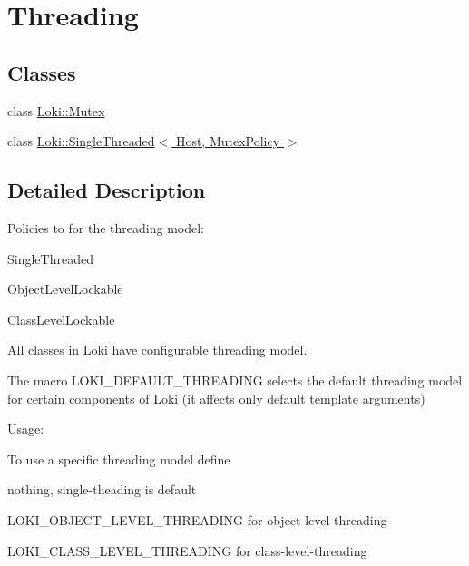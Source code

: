 \hypertarget{group__ThreadingGroup}{}\section{Threading}
\label{group__ThreadingGroup}
\subsection*{Classes}
\begin{DoxyCompactItemize}
\item 
class \hyperlink{classLoki_1_1Mutex}{Loki\+::\+Mutex}
\item 
class \hyperlink{classLoki_1_1SingleThreaded}{Loki\+::\+Single\+Threaded$<$ Host, Mutex\+Policy $>$}
\end{DoxyCompactItemize}


\subsection{Detailed Description}
Policies to for the threading model\+:


\begin{DoxyItemize}
\item Single\+Threaded
\item Object\+Level\+Lockable
\item Class\+Level\+Lockable
\end{DoxyItemize}

All classes in \hyperlink{namespaceLoki}{Loki} have configurable threading model.

The macro L\+O\+K\+I\+\_\+\+D\+E\+F\+A\+U\+L\+T\+\_\+\+T\+H\+R\+E\+A\+D\+I\+N\+G selects the default threading model for certain components of \hyperlink{namespaceLoki}{Loki} (it affects only default template arguments)

\begin{DoxyParagraph}{Usage\+:}

\end{DoxyParagraph}
To use a specific threading model define


\begin{DoxyItemize}
\item nothing, single-\/theading is default
\item L\+O\+K\+I\+\_\+\+O\+B\+J\+E\+C\+T\+\_\+\+L\+E\+V\+E\+L\+\_\+\+T\+H\+R\+E\+A\+D\+I\+N\+G for object-\/level-\/threading
\item L\+O\+K\+I\+\_\+\+C\+L\+A\+S\+S\+\_\+\+L\+E\+V\+E\+L\+\_\+\+T\+H\+R\+E\+A\+D\+I\+N\+G for class-\/level-\/threading
\end{DoxyItemize}

